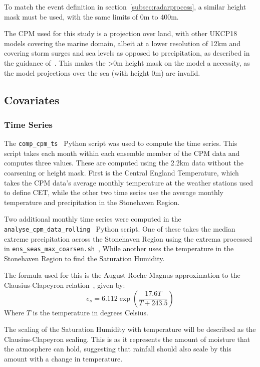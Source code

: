 To match the event definition in section~\ref{subsec:radarprocess},
    a similar height mask must be used,
    with the same limits of 0m to 400m.

The CPM used for this study is a projection over land,
    with other UKCP18 models covering the marine domain,
    albeit at a lower resolution of 12km and covering storm surges and sea levels as opposed to precipitation,
    as described in the guidance of~\cite{model_data}.
This makes the >0m height mask on the model a necessity,
    as the model projections over the sea (with height 0m) are invalid.

\subsection{Covariates}\label{subsec:covfit}

\subsubsection{Time Series}

The \texttt{comp\_cpm\_ts}~\cite{Me_Code} Python script was used to compute the time series.
This script takes each month within each ensemble member of the CPM data and computes three values.
These are computed using the 2.2km data without the coarsening or height mask.
First is the Central England Temperature,
    which takes the CPM data's average monthly temperature at the weather stations used to define CET,
    while the other two time series use the average monthly temperature and precipitation in the Stonehaven Region.

Two additional monthly time series were computed in the \texttt{analyse\_cpm\_data\_rolling}~\cite{Me_Code} Python script.
One of these takes the median extreme precipitation across the Stonehaven Region
    using the extrema processed in \texttt{ens\_seas\_max\_coarsen.sh}~\cite{Me_Code},
While another uses the temperature in the Stonehaven Region to find the Saturation Humidity.

The formula used for this is the August-Roche-Magnus approximation to the Clausius-Clapeyron relation~\cite{Alduchov_Eskridge_1996}, given by:
\begin{equation}\label{eq:qsat}
    e_s = 6.112 \exp\left( \frac{17.6 T}{T + 243.5} \right)
\end{equation}
Where $T$ is the temperature in degrees Celsius.

The scaling of the Saturation Humidity with temperature will be described as the Clausius-Clapeyron scaling.
This is as it represents the amount of moisture that the atmosphere can hold,
    suggesting that rainfall should also scale by this amount with a change in temperature.

